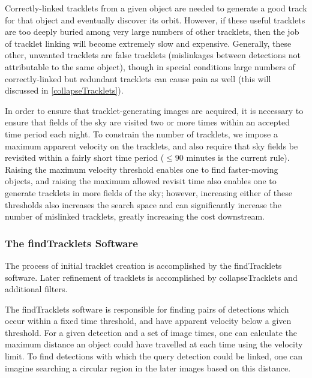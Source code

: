 Correctly-linked tracklets from a given object are needed to generate
a good track for that object and eventually discover its orbit.
However, if these useful tracklets are too deeply buried among very
large numbers of other tracklets, then the job of tracklet linking
will become extremely slow and expensive.  Generally, these other,
unwanted tracklets are false tracklets (mislinkages between detections
not attributable to the same object), though in special conditions
large numbers of correctly-linked but redundant tracklets can cause
pain as well (this will discussed in \ref{collapseTracklets}).

In order to ensure that tracklet-generating images are acquired, it is
necessary to ensure that fields of the sky are visited two or more
times within an accepted time period each night. To constrain the
number of tracklets, we impose a maximum apparent velocity on the
tracklets, and also require that sky fields be revisited within a
fairly short time period ($\leq 90$ minutes is the current rule).
Raising the maximum velocity threshold enables one to find
faster-moving objects, and raising the maximum allowed revisit time
also enables one to generate tracklets in more fields of the sky;
however, increasing either of these thresholds also increases the
search space and can significantly increase the number of mislinked
tracklets, greatly increasing the cost downstream.




\subsubsection{The findTracklets Software}

The process of initial tracklet creation is accomplished by the
findTracklets software.  Later refinement of tracklets is accomplished
by collapseTracklets and additional filters.


The findTracklets software is responsible for finding pairs of
detections which occur within a fixed time threshold, and have
apparent velocity below a given threshold.  For a given detection and
a set of image times, one can calculate the maximum distance an object
could have travelled at each time using the velocity limit.  To find
detections with which the query detection could be linked, one can
imagine searching a circular region in the later images based on this
distance.

